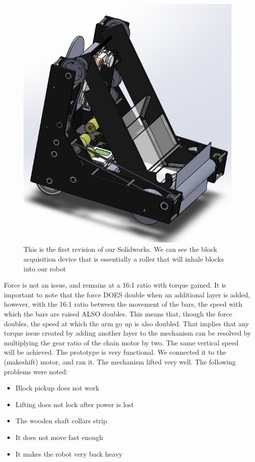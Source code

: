 \begin{figure}[H]
\begin{center}
\includegraphics[scale=0.5]{images/RobotV1.png}
\end{center}
\caption{This is the first revision of our Solidworks. We can see the block acquisition device that is essentially a roller that will inhale blocks into our robot}
\end{figure}

Force is not an issue, and remains at a 16:1 ratio with torque gained. It is important to note that the force DOES double when an additional layer is added, however, with the 16:1 ratio between the movement of the bars, the speed with which the bars are raised ALSO doubles. This means that, though the force doubles, the speed at which the arm go up is also doubled. That implies that any torque issue created by adding another layer to the mechanism can be resolved by multiplying the gear ratio of the chain motor by two. The same vertical speed will be achieved.
The prototype is very functional. We connected it to the (makeshift) motor, and ran it. The mechanism lifted very well. The following problems were noted:
\begin{itemize}
\item Block pickup does not work
\item Lifting does not lock after power is lost
\item The wooden shaft collars strip
\item It does not move fast enough
\item It makes the robot very back heavy
\end{itemize}

